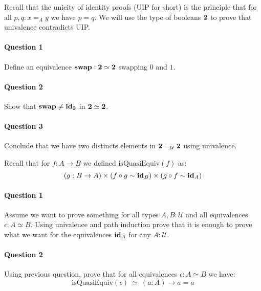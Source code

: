 \documentclass{article}[6pt]%
\newcommand{\U}{{\mathcal U}}
\renewcommand{\r}{\rightarrow}
\newcommand{\id}{\mathrm{\bf id}}
\newcommand{\two}{{\bf 2}}
\newtheorem{remark}{Remark}
\begin{document}
\begin{Exercise}[title={Univalence contradicts unicity of identity proofs}]
Recall that the unicity of identity proofs (UIP for short) is the principle that for all $p,q:x=_Ay$ we have $p=q$. We will use the type of booleans $\two$ to prove that univalence contradicts UIP.

\paragraph{Question 1} Define an equivalence $\mathrm{\bf swap} : \two\simeq \two$
swapping $0$ and $1$.

\paragraph{Question 2} Show that $\mathrm{\bf swap}\neq \id_\two$ in $\two\simeq\two$.

\paragraph{Question 3} Conclude that we have two distincts elements in $\two=_\U\two$ using univalence.
 
\end{Exercise}


\begin{Exercise}[title={Quasi-equivalences},difficulty=1]
Recall that for $f:A\r B$ we defined $\mathrm{isQuasiEquiv}(f)$ as:
\[(g:B\r A)\times (f\circ g\sim \id_B) \times (g\circ f\sim \id_A)\]

\paragraph{Question 1}
Assume we want to prove something for all types $A,B:\U$ and all equivalences $\epsilon : A\simeq B$. Using univalence and path induction prove that it is enough to prove what we want for the equivalences $\id_A$ for any $A:\U$.


\paragraph{Question 2}
Using previous question, prove that for all equivalences $\epsilon:A\simeq B$ we have:
\[\mathrm{isQuasiEquiv}(\epsilon) \ \simeq \ (a:A)\r a=a\]

\end{Exercise}
\end{document}
